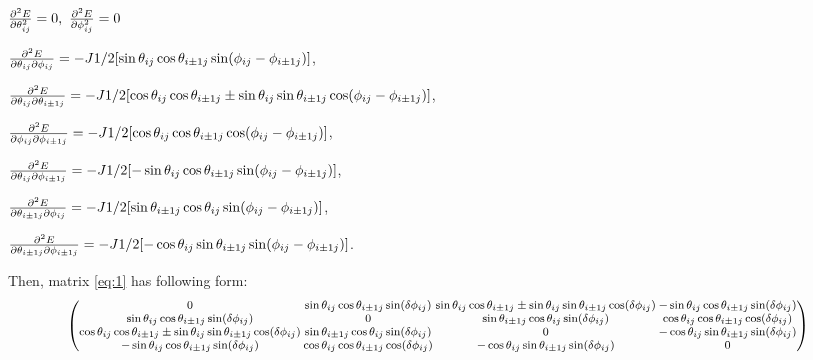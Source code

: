 \documentclass[9pt]{report}
\begin{document}
$\pdv[2]{E}{\theta_{ij}} = 0,\ \pdv[2]{E}{\phi_{ij}} = 0$
\newline

$\pdv{E}{\theta_{ij}}{\phi_{ij}} = -J1/2[\sin\theta_{ij}\cos\theta_{i\pm1j}\sin(\phi_{ij}-\phi_{i\pm1j})]$,

$\pdv{E}{\theta_{ij}}{\theta_{i\pm1j}} = -J1/2[\cos\theta_{ij}\cos\theta_{i\pm1j}\pm\sin\theta_{ij}\sin\theta_{i\pm1j}\cos(\phi_{ij}-\phi_{i\pm1j})]$,

$\pdv{E}{\phi_{ij}}{\phi_{i\pm1j}} = -J1/2[\cos\theta_{ij}\cos\theta_{i\pm1j}\cos(\phi_{ij}-\phi_{i\pm1j})]$,

$\pdv{E}{\theta_{ij}}{\phi_{i\pm1j}} = -J1/2[-\sin\theta_{ij}\cos\theta_{i\pm1j}\sin(\phi_{ij}-\phi_{i\pm1j})]$,

$\pdv{E}{\theta_{i\pm1j}}{\phi_{ij}} = -J1/2[\sin\theta_{i\pm1j}\cos\theta_{ij}\sin(\phi_{ij}-\phi_{i\pm1j})]$,

$\pdv{E}{\theta_{i\pm1j}}{\phi_{i\pm1j}} = -J1/2[-\cos\theta_{ij}\sin\theta_{i\pm1j}\sin(\phi_{ij}-\phi_{i\pm1j})]$.
\newline

Then, matrix \eqref{eq:1} has following form:
\begin{equation*}
	\footnotesize
	\setlength\arraycolsep{1pt}
	\begin{pmatrix}
		
		0 & \sin\theta_{ij}\cos\theta_{i\pm1j}\sin(\delta \phi_{ij}) & \sin\theta_{ij}\cos\theta_{i\pm1j}\pm \sin\theta_{ij}\sin\theta_{i\pm1j}\cos(\delta \phi_{ij}) & -\sin\theta_{ij}\cos\theta_{i\pm1j}\sin(\delta \phi_{ij})\\
		\sin\theta_{ij}\cos\theta_{i\pm1j}\sin(\delta \phi_{ij}) & 0 & \sin\theta_{i\pm1j}\cos\theta_{ij}\sin(\delta \phi_{ij}) & \cos\theta_{ij}\cos\theta_{i\pm1j}\cos(\delta \phi_{ij})\\
		\cos\theta_{ij}\cos\theta_{i\pm1j}\pm \sin\theta_{ij}\sin\theta_{i\pm1j}\cos(\delta \phi_{ij}) & \sin\theta_{i\pm1j}\cos\theta_{ij}\sin(\delta \phi_{ij}) & 0 & -\cos\theta_{ij}\sin\theta_{i\pm1j}\sin(\delta \phi_{ij})\\
		-\sin\theta_{ij}\cos\theta_{i\pm1j}\sin(\delta \phi_{ij}) & \cos\theta_{ij}\cos\theta_{i\pm1j}\cos(\delta \phi_{ij}) & -\cos\theta_{ij}\sin\theta_{i\pm1j}\sin(\delta \phi_{ij}) & 0
	\end{pmatrix}
\end{equation*}
\end{document}
